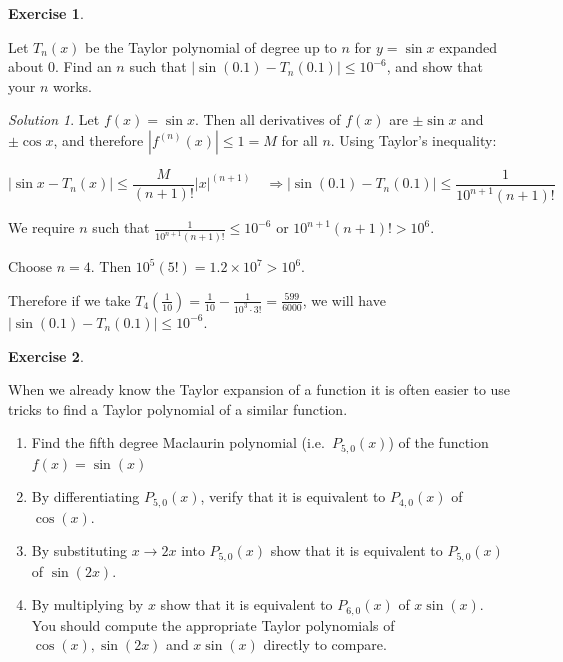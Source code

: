 \documentclass[
]{book}
\providecommand{\tightlist}{%
  \setlength{\itemsep}{0pt}\setlength{\parskip}{0pt}}
\theoremstyle{definition}
\theoremstyle{definition}
\theoremstyle{definition}
\newtheorem{exercise}{Exercise}[chapter]
\theoremstyle{definition}
\theoremstyle{remark}
\newtheorem*{solution}{Solution}
\begin{document}
\begin{exercise}
\protect\hypertarget{exr:unlabeled-div-275}{}\label{exr:unlabeled-div-275}

Let \(T_n(x)\) be the Taylor polynomial of degree up to \(n\) for \(y=\sin{x}\) expanded about 0. Find an \(n\) such that \(|\sin(0.1)-T_n(0.1)| \le 10^{-6}\), and show that your \(n\) works.

\end{exercise}

\begin{solution}

Let \(\displaystyle f(x)=\sin{x}\). Then all derivatives of \(f(x)\) are \(\pm \sin x\) and \(\pm \cos x\), and therefore \(|f^{(n)}(x)| \leq 1 = M\) for all \(n\). Using Taylor's inequality:

\[
    |\sin x - T_n(x)| \le \frac{M}{(n+1)!}|x|^{(n+1)} \quad \Longrightarrow |\sin(0.1)-T_n(0.1)| \le \frac{1}{10^{n+1}(n+1)!}
\]

We require \(n\) such that \(\displaystyle \frac{1}{10^{n+1}(n+1)!} \le 10^{-6}\) or \(10^{n+1}(n+1)!>10^6\).

Choose \(n=4\). Then \(10^5(5!)=1.2\times10^7>10^6\).

Therefore if we take \(\displaystyle T_4\left(\frac{1}{10}\right)=\frac{1}{10}-\frac{1}{10^3\cdot3!}=\frac{599}{6000}\), we will have \(|\sin(0.1)-T_n(0.1)| \le 10^{-6}\).

\end{solution}

\begin{exercise}
\protect\hypertarget{exr:unlabeled-div-277}{}\label{exr:unlabeled-div-277}

When we already know the Taylor expansion of a function it is often easier to use tricks to find a Taylor polynomial of a similar function.

\begin{enumerate}
\def\labelenumi{\arabic{enumi}.}
\tightlist
\item
  Find the fifth degree Maclaurin polynomial (i.e.~\(P_{5,0}(x)\)) of the function \(f(x)=\sin(x)\)
\item
  By differentiating \(P_{5,0}(x)\), verify that it is equivalent to \(P_{4,0}(x)\) of \(\cos(x)\).
\item
  By substituting \(x \rightarrow 2x\) into \(P_{5,0}(x)\) show that it is equivalent to \(P_{5,0}(x)\) of \(\sin(2x)\).
\item
  By multiplying by \(x\) show that it is equivalent to \(P_{6,0}(x)\) of \(x\sin(x)\).
  You should compute the appropriate Taylor polynomials of \(\cos(x), \sin(2x)\) and \(x\sin(x)\) directly to compare.
\end{enumerate}

\end{exercise}
\end{document}
